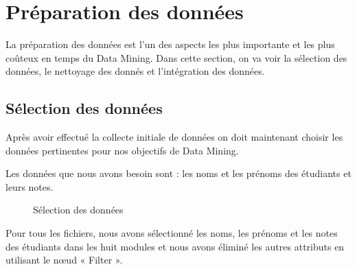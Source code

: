 \documentclass{article}
\begin{document}
            \section{Préparation des données}
            La préparation des données est l’un des aspects les plus importante et les plus coûteux en temps du Data Mining. Dans cette section, on va voir la sélection des données, le nettoyage des donnés et l’intégration des données.
            \subsection{Sélection des données }
            Après avoir effectué la collecte initiale de données on doit maintenant choisir les données pertinentes pour nos objectifs de Data Mining.
            \par Les données que nous avons besoin sont : les noms et les prénoms des étudiants et leurs notes.
            \begin{figure}[h!]
                \centering
                \caption{Sélection des données}
                \label{fig:13}
            \end{figure}
            \par Pour tous les fichiers, nous avons sélectionné les noms, les prénoms et les notes des étudiants dans les huit modules et nous avons éliminé les autres attributs en utilisant le nœud « Filter ». 
\end{document}
